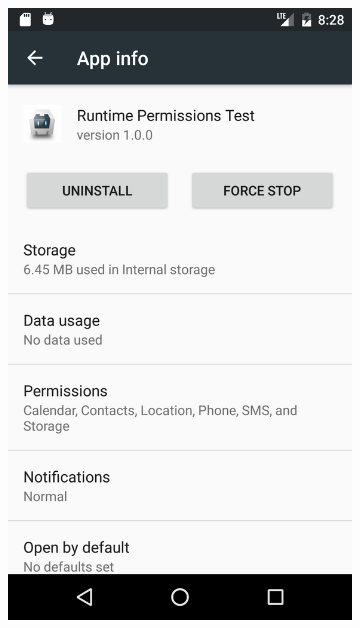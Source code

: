 \begin{figure}[hbtp]
    \centering
    \begin{subfigure}{0.3\linewidth}
        \includegraphics[width=\linewidth]{imgs/chapter1/app-info}
    \end{subfigure}
    \begin{subfigure}{0.3\linewidth}

\end{subfigure}
\end{figure}

